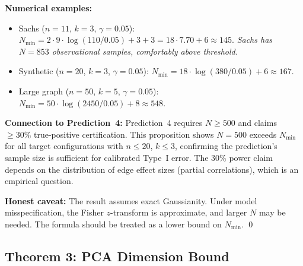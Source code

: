 \documentclass{article}
\theoremstyle{definition}
\theoremstyle{plain}
\theoremstyle{remark}
\begin{document}
\textbf{Numerical examples:}
\begin{itemize}
  \item Sachs ($n = 11$, $k = 3$, $\gamma = 0.05$):
    $N_{\min} = 2 \cdot 9 \cdot \log(110/0.05) + 3 + 3 = 18 \cdot 7.70 + 6 \approx 145$.
    \emph{Sachs has $N = 853$ observational samples, comfortably above threshold.}
  \item Synthetic ($n = 20$, $k = 3$, $\gamma = 0.05$):
    $N_{\min} = 18 \cdot \log(380/0.05) + 6 \approx 167$.
  \item Large graph ($n = 50$, $k = 5$, $\gamma = 0.05$):
    $N_{\min} = 50 \cdot \log(2450/0.05) + 8 \approx 548$.
\end{itemize}

\textbf{Connection to Prediction~4:} Prediction~4 requires $N \geq 500$ and claims
$\geq 30\%$ true-positive certification. This proposition shows $N = 500$ exceeds
$N_{\min}$ for all target configurations with $n \leq 20$, $k \leq 3$, confirming
the prediction's sample size is sufficient for calibrated Type~I error. The 30\%
power claim depends on the distribution of edge effect sizes (partial correlations),
which is an empirical question.

\textbf{Honest caveat:} The result assumes exact Gaussianity. Under model
misspecification, the Fisher $z$-transform is approximate, and larger $N$ may be
needed. The formula should be treated as a lower bound on $N_{\min}$. \qed

\subsection{Theorem 3: PCA Dimension Bound}
\end{document}
